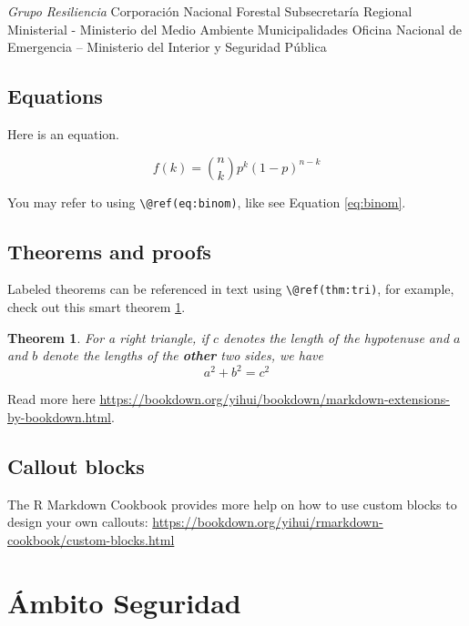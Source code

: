 \documentclass[
]{book}
\newtheorem{theorem}{Theorem}[chapter]
\theoremstyle{definition}
\theoremstyle{definition}
\theoremstyle{definition}
\theoremstyle{definition}
\theoremstyle{remark}
\begin{document}
\emph{Grupo Resiliencia}
Corporación Nacional Forestal
Subsecretaría Regional Ministerial - Ministerio del Medio Ambiente
Municipalidades
Oficina Nacional de Emergencia -- Ministerio del Interior y Seguridad Pública

\hypertarget{equations}{%
\section*{Equations}\label{equations}}

Here is an equation.

\begin{equation} 
  f\left(k\right) = \binom{n}{k} p^k\left(1-p\right)^{n-k}
  \label{eq:binom}
\end{equation}

You may refer to using \texttt{\textbackslash{}@ref(eq:binom)}, like see Equation \eqref{eq:binom}.

\hypertarget{theorems-and-proofs}{%
\section*{Theorems and proofs}\label{theorems-and-proofs}}

Labeled theorems can be referenced in text using \texttt{\textbackslash{}@ref(thm:tri)}, for example, check out this smart theorem \ref{thm:tri}.

\begin{theorem}
\protect\hypertarget{thm:tri}{}\label{thm:tri}For a right triangle, if \(c\) denotes the \emph{length} of the hypotenuse
and \(a\) and \(b\) denote the lengths of the \textbf{other} two sides, we have
\[a^2 + b^2 = c^2\]
\end{theorem}

Read more here \url{https://bookdown.org/yihui/bookdown/markdown-extensions-by-bookdown.html}.

\hypertarget{callout-blocks}{%
\section*{Callout blocks}\label{callout-blocks}}

The R Markdown Cookbook provides more help on how to use custom blocks to design your own callouts: \url{https://bookdown.org/yihui/rmarkdown-cookbook/custom-blocks.html}

\hypertarget{uxe1mbito-seguridad}{%
\chapter{Ámbito Seguridad}\label{uxe1mbito-seguridad}}
\end{document}
